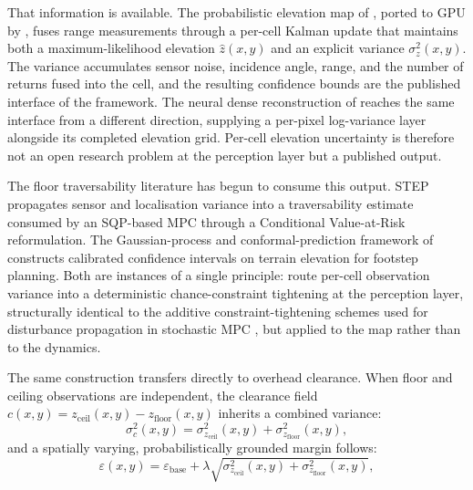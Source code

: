 \documentclass[11pt,a4paper]{article}
\begin{document}
That information is available. The probabilistic elevation map of \citet{fankhauserProbabilisticTerrainMapping2018}, ported to GPU by \citet{mikiElevationMappingLocomotion2022}, fuses range measurements through a per-cell Kalman update that maintains both a maximum-likelihood elevation $\hat{z}(x,y)$ and an explicit variance $\sigma^2_z(x,y)$. The variance accumulates sensor noise, incidence angle, range, and the number of returns fused into the cell, and the resulting confidence bounds are the published interface of the framework. The neural dense reconstruction of \citet{yangRealtimeNeuralDense2023} reaches the same interface from a different direction, supplying a per-pixel log-variance layer alongside its completed elevation grid. Per-cell elevation uncertainty is therefore not an open research problem at the perception layer but a published output.

The floor traversability literature has begun to consume this output. STEP \citep{fanSTEPStochasticTraversability2021} propagates sensor and localisation variance into a traversability estimate consumed by an SQP-based MPC through a Conditional Value-at-Risk reformulation. The Gaussian-process and conformal-prediction framework of \citet{bipedal_cp_2025} constructs calibrated confidence intervals on terrain elevation for footstep planning. Both are instances of a single principle: route per-cell observation variance into a deterministic chance-constraint tightening at the perception layer, structurally identical to the additive constraint-tightening schemes used for disturbance propagation in stochastic MPC \citep{hewingLearningBasedModelPredictive2020,lorenzenConstraintTighteningStabilityStochastic2016}, but applied to the map rather than to the dynamics.

The same construction transfers directly to overhead clearance. When floor and ceiling observations are independent, the clearance field $c(x,y) = z_{\text{ceil}}(x,y) - z_{\text{floor}}(x,y)$ inherits a combined variance:
\begin{equation}
    \sigma^2_c(x,y) = \sigma^2_{z_{\text{ceil}}}(x,y) + \sigma^2_{z_{\text{floor}}}(x,y),
    \label{eq:clearance_variance}
\end{equation}
and a spatially varying, probabilistically grounded margin follows:
\begin{equation}
    \varepsilon(x,y) = \varepsilon_{\text{base}} + \lambda \sqrt{\sigma^2_{z_{\text{ceil}}}(x,y) + \sigma^2_{z_{\text{floor}}}(x,y)},
    \label{eq:probabilistic_margin}
\end{equation}
\end{document}
